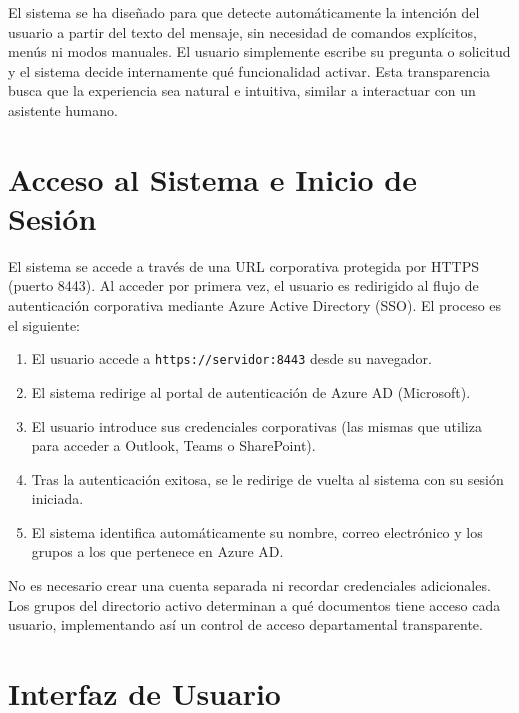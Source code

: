 El sistema se ha diseñado para que detecte automáticamente la intención del usuario a partir del texto del mensaje, sin necesidad de comandos explícitos, menús ni modos manuales. El usuario simplemente escribe su pregunta o solicitud y el sistema decide internamente qué funcionalidad activar. Esta transparencia busca que la experiencia sea natural e intuitiva, similar a interactuar con un asistente humano.

\section{Acceso al Sistema e Inicio de Sesión}

El sistema se accede a través de una URL corporativa protegida por HTTPS (puerto 8443). Al acceder por primera vez, el usuario es redirigido al flujo de autenticación corporativa mediante Azure Active Directory (SSO). El proceso es el siguiente:

\begin{enumerate}
    \item El usuario accede a \texttt{https://servidor:8443} desde su navegador.
    \item El sistema redirige al portal de autenticación de Azure AD (Microsoft).
    \item El usuario introduce sus credenciales corporativas (las mismas que utiliza para acceder a Outlook, Teams o SharePoint).
    \item Tras la autenticación exitosa, se le redirige de vuelta al sistema con su sesión iniciada.
    \item El sistema identifica automáticamente su nombre, correo electrónico y los grupos a los que pertenece en Azure AD.
\end{enumerate}

No es necesario crear una cuenta separada ni recordar credenciales adicionales. Los grupos del directorio activo determinan a qué documentos tiene acceso cada usuario, implementando así un control de acceso departamental transparente.

\section{Interfaz de Usuario}
\label{sec:interfaz}

